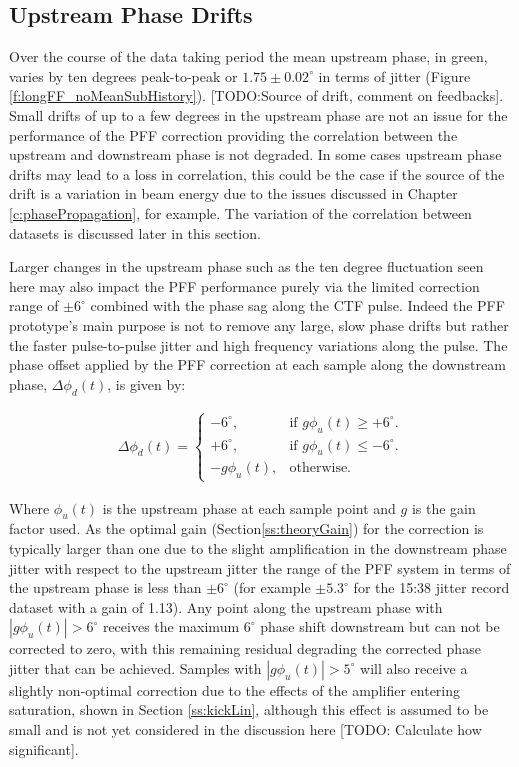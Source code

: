 \subsection{Upstream Phase Drifts}
\label{ss:longFF_upDrifts}

Over the course of the data taking period the mean upstream phase, in green, varies by ten degrees peak-to-peak or \(1.75 \pm 0.02^\circ\) in terms of jitter (Figure \ref{f:longFF_noMeanSubHistory}). [TODO:Source of drift, comment on feedbacks]. Small drifts of up to a few degrees in the upstream phase are not an issue for the performance of the PFF correction providing the correlation between the upstream and downstream phase is not degraded. In some cases upstream phase drifts may lead to a loss in correlation, this could be the case if the source of the drift is a variation in beam energy due to the issues discussed in Chapter \ref{c:phasePropagation}, for example. The variation of the correlation between datasets is discussed later in this section.

Larger changes in the upstream phase such as the ten degree fluctuation seen here may also impact the PFF performance purely via the limited correction range of \(\pm6^\circ\) combined with the phase sag along the CTF pulse. Indeed the PFF prototype's main purpose is not to remove any large, slow phase drifts but rather the faster pulse-to-pulse jitter and high frequency variations along the pulse. The phase offset applied by the PFF correction at each sample along the downstream phase, \(\Delta\phi_d(t)\), is given by:

\begin{eqnarray}
	\Delta\phi_d(t) = \begin{cases}
	-6^\circ, &  \text{if $g\phi_u(t) \geq+6^\circ$.}\\
	+6^\circ, &  \text{if $g\phi_u(t)\leq-6^\circ$}.\\
	-g\phi_u(t), &  \text{otherwise.}
	\end{cases}
	\label{e:limCorrection}
\end{eqnarray}

Where \(\phi_u(t)\) is the upstream phase at each sample point and \(g\) is the gain factor used. As the optimal gain (Section\ref{ss:theoryGain}) for the correction is typically larger than one due to the slight amplification in the downstream phase jitter with respect to the upstream jitter the range of the PFF system in terms of the upstream phase is less than \(\pm6^\circ\) (for example \(\pm5.3^\circ\) for the 15:38 jitter record dataset with a gain of 1.13). Any point along the upstream phase with \(|g\phi_u(t)| > 6^\circ\) receives the maximum \(6^\circ\) phase shift downstream but can not be corrected to zero, with this remaining residual degrading the corrected phase jitter that can be achieved. Samples with  \(|g\phi_u(t)| > 5^\circ\) will also receive a slightly non-optimal correction due to the effects of the amplifier entering saturation, shown in Section \ref{ss:kickLin}, although this effect is assumed to be small and is not yet considered in the discussion here [TODO: Calculate how significant]. 


